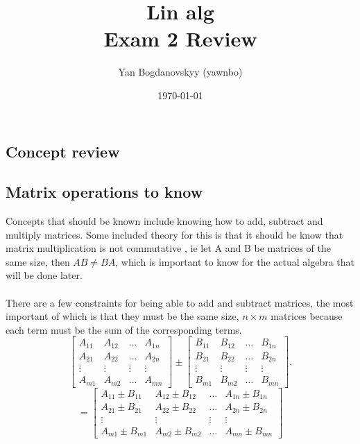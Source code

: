 \documentclass{report}
\title{\Huge{Lin alg}\\ Exam 2 Review }
\author{\huge{Yan Bogdanovskyy (yawnbo)}}
\date{\today}
\begin{document}
\maketitle
\begin{multicols}{2}
\chapter{Concept review}
\section{Matrix operations to know}%
\label{sec: Matrix operations to know }
Concepts that should be known include knowing how to add, subtract and multiply matrices. Some included theory for this is that it should be know that matrix multiplication is not commutative , ie let A and B be matrices of the same size, then $ AB \neq BA $, which is important to know for the actual algebra that will be done later. \\\\
There are a few constraints for being able to add and subtract matrices, the most important of which is that they must be the same size, $ n \times m $ matrices because each term must be the sum of the corresponding terms.
\[
	\begin{bmatrix} A_{ 11 } & A_{ 12 } & \ldots &  A_{ 1n } \\ A_{ 21 } & A_{ 22 } & \ldots & A_{ 2n } \\ \vdots & \vdots & \vdots & \vdots \\ A_{ m1 } & A_{ m2 } & \ldots & A_{ mn }\end{bmatrix} \pm 
	\begin{bmatrix} B_{ 11 } & B_{ 12 } & \ldots &  B_{ 1n } \\ B_{ 21 } & B_{ 22 } & \ldots & B_{ 2n } \\ \vdots & \vdots & \vdots & \vdots \\ B_{ m1 } & B_{ m2 } & \ldots & B_{ mn }\end{bmatrix} 
.\] 
\[
= \begin{bmatrix} A_{ 11 } \pm B_{ 11 } & A_{ 12 } \pm B_{ 12 } & \ldots &  A_{ 1n } \pm B_{ 1n } \\ A_{ 21 } \pm B_{ 21 } & A_{ 22 } \pm B_{ 22 } & \ldots & A_{ 2n } \pm B_{ 2n } \\ \vdots & \vdots & \vdots & \vdots \\ A_{ m1 } \pm B_{ m1 } & A_{ m2 } \pm B_{ m2 } & \ldots & A_{ mn } \pm B_{ mn }\end{bmatrix}
\]
\end{multicols}
\end{document}
